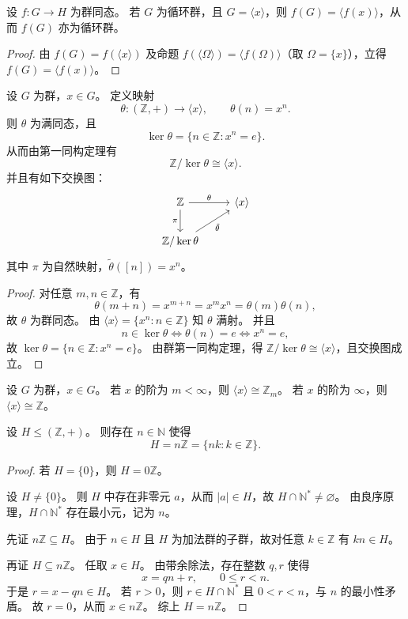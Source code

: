 \documentclass[lang=cn,a4paper,newtx]{elegantbook}
\begin{document}
\begin{corollary}
设 $f:G\to H$ 为群同态。
若 $G$ 为循环群，且 $G=\langle x\rangle$，则 $f(G)=\langle f(x)\rangle$，从而 $f(G)$ 亦为循环群。
\end{corollary}

\begin{proof}
由 $f(G)=f(\langle x\rangle)$ 及命题 $f(\langle\Omega\rangle)=\langle f(\Omega)\rangle$（取 $\Omega=\{x\}$），立得 $f(G)=\langle f(x)\rangle$。
\end{proof}

\begin{proposition}
设 $G$ 为群，$x\in G$。
定义映射
\[
  \theta:(\mathbb{Z},+)\to \langle x\rangle,\qquad \theta(n)=x^n.
\]
则 $\theta$ 为满同态，且
\[
  \ker\theta=\{n\in \mathbb{Z}:x^n=e\}.
\]
从而由第一同构定理有
\[
  \mathbb{Z}/\ker\theta\cong \langle x\rangle.
\]
并且有如下交换图：
\[
\begin{tikzcd}
 \mathbb{Z} \arrow[r,"\theta"] \arrow[d,"\pi"'] & \langle x\rangle \\
 \mathbb{Z}/\ker\theta \arrow[ur,"\tilde\theta"']
\end{tikzcd}
\]
其中 $\pi$ 为自然映射，$\tilde\theta([n])=x^n$。
\end{proposition}

\begin{proof}
对任意 $m,n\in \mathbb{Z}$，有
\[
  \theta(m+n)=x^{m+n}=x^mx^n=\theta(m)\theta(n),
\]
故 $\theta$ 为群同态。
由 $\langle x\rangle=\{x^n:n\in \mathbb{Z}\}$ 知 $\theta$ 满射。
并且
\[
  n\in \ker\theta\iff \theta(n)=e\iff x^n=e,
\]
故 $\ker\theta=\{n\in \mathbb{Z}:x^n=e\}$。
由群第一同构定理，得 $\mathbb{Z}/\ker\theta\cong \langle x\rangle$，且交换图成立。
\end{proof}

\begin{corollary}
设 $G$ 为群，$x\in G$。
若 $x$ 的阶为 $m<\infty$，则 $\langle x\rangle\cong \mathbb{Z}_m$。
若 $x$ 的阶为 $\infty$，则 $\langle x\rangle\cong \mathbb{Z}$。
\end{corollary}

\begin{proposition}\label{subgroup-of-Z}
设 $H\le (\mathbb{Z},+)$。
则存在 $n\in \mathbb{N}$ 使得
\[
  H=n\mathbb{Z}=\{nk:k\in \mathbb{Z}\}.
\]
\end{proposition}

\begin{proof}
若 $H=\{0\}$，则 $H=0\mathbb{Z}$。

设 $H\ne\{0\}$。
则 $H$ 中存在非零元 $a$，从而 $|a|\in H$，故 $H\cap \mathbb{N}^*\ne\varnothing$。
由良序原理，$H\cap \mathbb{N}^*$ 存在最小元，记为 $n$。

先证 $n\mathbb{Z}\subseteq H$。
由于 $n\in H$ 且 $H$ 为加法群的子群，故对任意 $k\in \mathbb{Z}$ 有 $kn\in H$。

再证 $H\subseteq n\mathbb{Z}$。
任取 $x\in H$。
由带余除法，存在整数 $q,r$ 使得
\[
  x=qn+r,\qquad 0\le r<n.
\]
于是 $r=x-qn\in H$。
若 $r>0$，则 $r\in H\cap \mathbb{N}^*$ 且 $0<r<n$，与 $n$ 的最小性矛盾。
故 $r=0$，从而 $x\in n\mathbb{Z}$。
综上 $H=n\mathbb{Z}$。
\end{proof}
\end{document}
